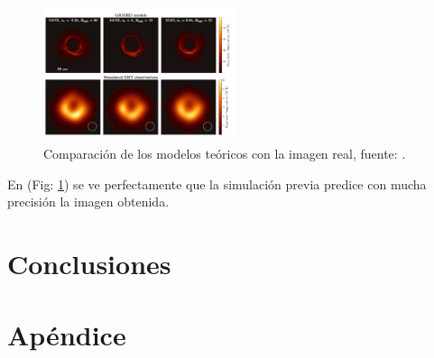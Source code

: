 \documentclass{article}
\begin{document}
\begin{figure}[H]
    \centering
    \includegraphics[width=0.5\textwidth]{M87_real_simulation.png}
    \caption{Comparación de los modelos teóricos con la imagen real, fuente: \cite{event2019firstI}.}
    \label{fig:M87_real_simulation}
\end{figure}

En (Fig: \ref{fig:M87_real_simulation}) se ve perfectamente que la simulación previa predice con mucha precisión la imagen obtenida.

\section{Conclusiones}
\section{Apéndice}


\printindex
\end{document}

